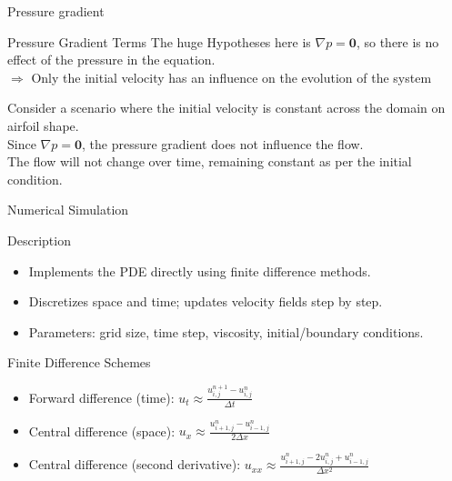 \begin{secframe}
\small
\textcolor{red_unipd}{\Large Pressure gradient}

\vspace{0.6em}

\begin{alertblock}{Pressure Gradient Terms}
  The huge Hypotheses here is \(\nabla p=\mathbf{0}\), so there is no effect of the pressure in the equation. \\
  \( \Rightarrow \) Only the initial velocity has an influence on the evolution of the system
\end{alertblock}

\begin{example}
  Consider a scenario where the initial velocity is constant across the domain on airfoil shape. \\
  Since \(\nabla p=\mathbf{0}\), the pressure gradient does not influence the flow. \\
  The flow will not change over time, remaining constant as per the initial condition.
\end{example}



\end{secframe}

\begin{secframe}
\small
\textcolor{red_unipd}{\Large Numerical Simulation}

\vspace{0.6em}

\begin{block}{Description}
\begin{itemize}
  \item Implements the PDE directly using finite difference methods.
  \item Discretizes space and time; updates velocity fields step by step.
  \item Parameters: grid size, time step, viscosity, initial/boundary conditions.
\end{itemize}
\end{block}

\begin{alertblock}{Finite Difference Schemes}
\begin{itemize}
  \item Forward difference (time): $u_t \approx \frac{u_{i,j}^{n+1} - u_{i,j}^n}{\Delta t}$
  \item Central difference (space): $u_x \approx \frac{u_{i+1,j}^n - u_{i-1,j}^n}{2\Delta x}$
  \item Central difference (second derivative): $u_{xx} \approx \frac{u_{i+1,j}^n - 2u_{i,j}^n + u_{i-1,j}^n}{\Delta x^2}$
\end{itemize}
\end{alertblock}

\end{secframe}

